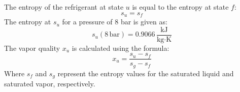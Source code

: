 The entropy of the refrigerant at state \( u \) is equal to the entropy at state \( f \):  
\[
s_u = s_f
\]  
The entropy at \( s_u \) for a pressure of 8 bar is given as:  
\[
s_u (8 \, \text{bar}) = 0.9066 \, \frac{\text{kJ}}{\text{kg·K}}
\]  
The vapor quality \( x_u \) is calculated using the formula:  
\[
x_u = \frac{s_u - s_f}{s_g - s_f}
\]  
Where \( s_f \) and \( s_g \) represent the entropy values for the saturated liquid and saturated vapor, respectively.